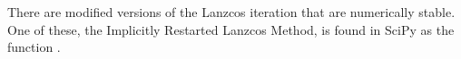 There are modified versions of the Lanzcos iteration that are numerically stable.
One of these, the Implicitly Restarted Lanzcos Method, is found in SciPy as the function .


